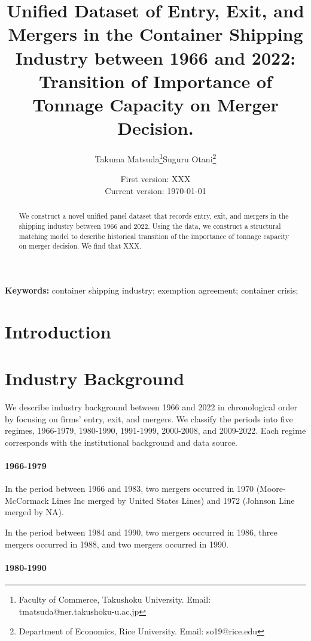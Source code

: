 \documentclass[10pt]{article}
\title{Unified Dataset of Entry, Exit, and Mergers in the Container Shipping Industry between 1966 and 2022: Transition of Importance of Tonnage Capacity on Merger Decision.}
\author{Takuma Matsuda\thanks{Faculty of Commerce, Takushoku University. Email: tmatsuda@ner.takushoku-u.ac.jp}\quad Suguru Otani\thanks{Department of Economics, Rice University. Email: so19@rice.edu}}
\date{
First version: XXX\\
Current version: \today
}
\begin{document}
\maketitle

\begin{abstract}
We construct a novel unified panel dataset that records entry, exit, and mergers in the shipping industry between 1966 and 2022. Using the data, we construct a structural matching model \citep{fox2018estimating} to describe historical transition of the importance of tonnage capacity on merger decision. We find that XXX.
\end{abstract} 

\vspace{0.1in}
\noindent\textbf{Keywords:} container shipping industry; exemption agreement; container crisis; 
\vspace{0in}


\section{Introduction}


\section{Industry Background}
We describe industry background between 1966 and 2022 in chronological order by focusing on firms' entry, exit, and mergers. We classify the periods into five regimes, 1966-1979, 1980-1990, 1991-1999, 2000-2008, and 2009-2022. Each regime corresponds with the institutional background and data source.


\paragraph{1966-1979} 

\cite{matsuda2022unified}

In the period between 1966 and 1983, two mergers occurred in 1970 (Moore-McCormack Lines Inc merged by United States Lines) and 1972 (Johnson Line merged by NA).

In the period between 1984 and 1990, two mergers occurred in 1986, three mergers occurred in 1988, and two mergers occurred in 1990. 


\paragraph{1980-1990}
\end{document}
